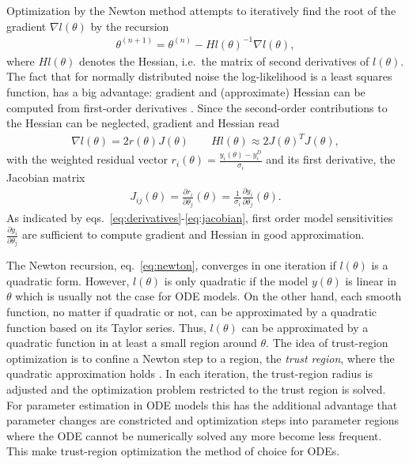 \documentclass[article]{jss}
\begin{document}
Optimization by the Newton method attempts to iteratively find the root of the gradient $\nabla l (\theta)$ by the recursion
\begin{align}
	\theta^{(n+1)} = \theta^{(n)} - Hl(\theta)^{-1}\nabla l(\theta),
	\label{eq:newton}
\end{align}
where $Hl(\theta)$ denotes the Hessian, i.e.~the matrix of second derivatives of $l(\theta)$. The fact that for normally distributed noise the log-likelihood is a least squares function, has a big advantage: gradient and (approximate) Hessian can be computed from first-order derivatives  \citep{press1996numerical}. Since the second-order contributions to the Hessian can be neglected, gradient and Hessian read
\begin{align}
	\nabla l(\theta) = 2 r(\theta) J(\theta) \quad\quad Hl(\theta) \approx 2 J(\theta)^T J(\theta),
	\label{eq:derivatives}
\end{align}
with the weighted residual vector $r_i(\theta) = \frac{y_i(\theta) - y_i^D}{\sigma_i}$ and its first derivative, the Jacobian matrix
\begin{align}
	J_{ij}(\theta) = \frac{\partial r_i}{\partial \theta_j}(\theta) = \frac{1}{\sigma_i} \frac{\partial y_i}{\partial \theta_j}(\theta). \label{eq:jacobian}
\end{align}
As indicated by eqs.~\eqref{eq:derivatives}-\eqref{eq:jacobian},  first order model sensitivities $\frac{\partial y_i}{\partial\theta_j}$ are sufficient to compute gradient and Hessian in good approximation.

The Newton recursion, eq.~\eqref{eq:newton}, converges in one iteration if $l(\theta)$ is a quadratic form. However, $l(\theta)$ is only quadratic if the model $y(\theta)$ is linear in $\theta$ which is usually not the case for ODE models. On the other hand, each smooth function, no matter if quadratic or not, can be approximated by a quadratic function based on its Taylor series.
Thus, $l(\theta)$ can be approximated by a quadratic function in at least a small region around $\theta$. The idea of trust-region optimization is to confine a Newton step to a region, the \textit{trust region}, where the quadratic approximation holds \citep{wright1999numerical}.
In each iteration, the trust-region radius is adjusted and the optimization problem restricted to the trust region is solved. For parameter estimation in ODE models this has the additional advantage that parameter changes are constricted and optimization steps into parameter regions where the ODE cannot be numerically solved any more  become less frequent. This make trust-region optimization the method of choice for ODEs.
\end{document}
